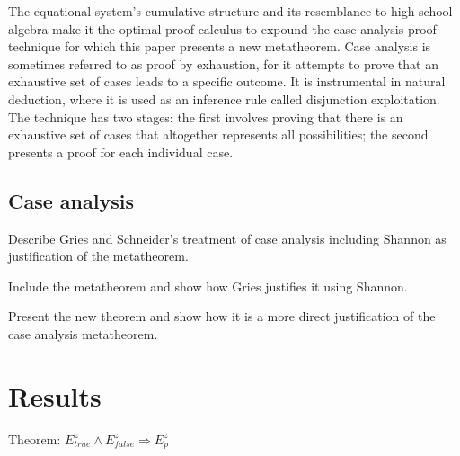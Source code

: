 \documentclass[12pt, fleqn, leqno]{article}
\newcommand{\impl}{\ensuremath{\Rightarrow}}        %
\begin{document}
The equational system’s cumulative structure and its resemblance to high-school algebra make it the optimal proof calculus to expound the case analysis proof technique for which this paper presents a new metatheorem. Case analysis is sometimes referred to as proof by exhaustion, for it attempts to prove that an exhaustive set of cases leads to a specific outcome. It is instrumental in natural deduction, where it is used as an inference rule called disjunction exploitation. The technique has two stages: the first involves proving that there is an exhaustive set of cases that altogether represents all possibilities; the second presents a proof for each individual case.

\subsection{Case analysis}

Describe Gries and Schneider's treatment of case analysis including Shannon as justification of the metatheorem.

Include the metatheorem and show how Gries justifies it using Shannon. 

Present the new theorem and show how it is a more direct justification of the case analysis metatheorem.

\section{Results}

Theorem: $E^{z}_{true}\land E^{z}_{false} \impl E^{z}_{p}$
\end{document}
